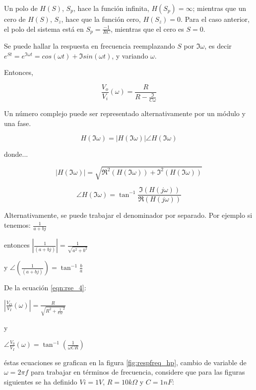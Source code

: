 Un polo de $H(S)$, $S_p$, hace la función infinita, $H(S_p) = \infty$; mientras que un cero de $H(S)$, $S_z$, hace que la función cero, $H(S_z) = 0$. Para el caso anterior, el polo del sistema está en $S_p = \frac{-1}{R C}$, mientras que el cero es $S = 0$.

Se puede hallar la respuesta en frecuencia reemplazando $S$ por $\Im\omega$, es decir $e^{S t} = e^{\Im \omega t} = cos(\omega t) + \Im sin(\omega t)$, y variando $\omega$.

Entonces,

\begin{equation}\label{eqn:rse_4}
	\frac{V_o}{V_i}(\omega) = \frac{R}{R - \frac{\Im}{C \omega}}
\end{equation}

Un número complejo puede ser representado alternativamente por un módulo y una fase.

\begin{equation}\label{eqn:rse_5}
	H(\Im \omega) = |H(\Im \omega)| \angle H(\Im \omega)
\end{equation}

donde...

\begin{equation}\label{eqn:rse_6}
	|H(\Im \omega)| = \sqrt{\Re^2(H(\Im \omega)) + \Im^2(H(\Im \omega))}
\end{equation}

\begin{equation}\label{eqn:rse_7}
	\angle H(\Im \omega) = \tan^{-1}\frac{\Im(H(j\omega))}{\Re(H(j\omega))}
\end{equation}

Alternativamente, se puede trabajar el denominador por separado. Por ejemplo si tenemos: $\frac{1}{a+bj}$

entonces $|\frac{1}{(a+bj)}| = \frac{1}{\sqrt{a^2+b^2}}$

y $\angle (\frac{1}{(a+bj)}) = \tan^{-1} \frac{b}{a}$

De la ecuación \eqref{eqn:rse_4}:

$|\frac{V_O}{V_I} (\omega)| = \frac{R}{\sqrt{R^2+{\frac{1}{C\omega}}^2}}$

y

$\angle \frac{V_0}{V_I} (\omega) = \tan^{-1} (\frac{1}{\omega CR})$

éstas ecuaciones se grafican en la figura \ref{fig:respfreq_hp}, cambio de variable de $\omega = 2 \pi f$ para trabajar en términos de frecuencia, considere que para las figuras siguientes se ha definido $Vi=1V$, $R=10k\Omega$ y $C=1nF$:


